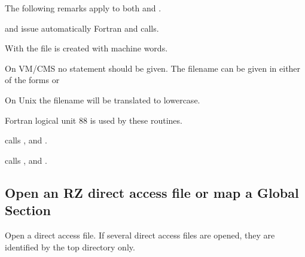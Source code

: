 \Remarks

The following remarks apply to both  and .

\begin{UL}
\item {} and  issue automatically Fortran  and
       calls. 
\item With  the file is created with  machine words.  
\item On VM/CMS no  statement should be given.
      The filename  can be given in either of the forms
       or 
\item On Unix the filename  will be translated to lowercase.
\item Fortran logical unit 88 is used by these routines.
\item {} calls ,  and .
\item {} calls ,  and .
\end{UL}
 
\subsection*{Open an RZ direct access file or map a Global Section}
 
 
\Action
Open a direct access \HBOOK{} file.
If several direct access files are opened,
they are identified by the top directory only.
 
